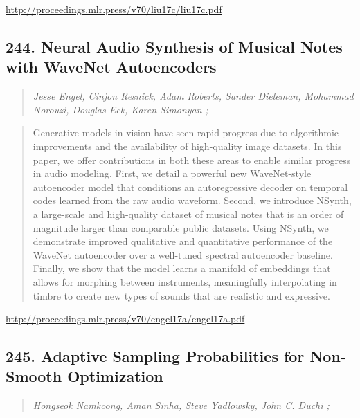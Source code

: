 \documentclass{article}
\begin{document}
\href{http://proceedings.mlr.press/v70/liu17c/liu17c.pdf}{http://proceedings.mlr.press/v70/liu17c/liu17c.pdf}

\subsection{244. Neural Audio Synthesis of Musical Notes with WaveNet Autoencoders}

\begin{quote}
\footnotesize{\textit{Jesse Engel, Cinjon Resnick, Adam Roberts, Sander Dieleman, Mohammad Norouzi, Douglas Eck, Karen Simonyan ;}}

\end{quote}

\begin{quote}
    Generative models in vision have seen rapid progress due to algorithmic improvements and the availability of high-quality image datasets. In this paper, we offer contributions in both these areas to enable similar progress in audio modeling. First, we detail a powerful new WaveNet-style autoencoder model that conditions an autoregressive decoder on temporal codes learned from the raw audio waveform. Second, we introduce NSynth, a large-scale and high-quality dataset of musical notes that is an order of magnitude larger than comparable public datasets. Using NSynth, we demonstrate improved qualitative and quantitative performance of the WaveNet autoencoder over a well-tuned spectral autoencoder baseline. Finally, we show that the model learns a manifold of embeddings that allows for morphing between instruments, meaningfully interpolating in timbre to create new types of sounds that are realistic and expressive.  
\end{quote}

\href{http://proceedings.mlr.press/v70/engel17a/engel17a.pdf}{http://proceedings.mlr.press/v70/engel17a/engel17a.pdf}

\subsection{245. Adaptive Sampling Probabilities for Non-Smooth Optimization}

\begin{quote}
\footnotesize{\textit{Hongseok Namkoong, Aman Sinha, Steve Yadlowsky, John C. Duchi ;}}

\end{quote}
\end{document}
